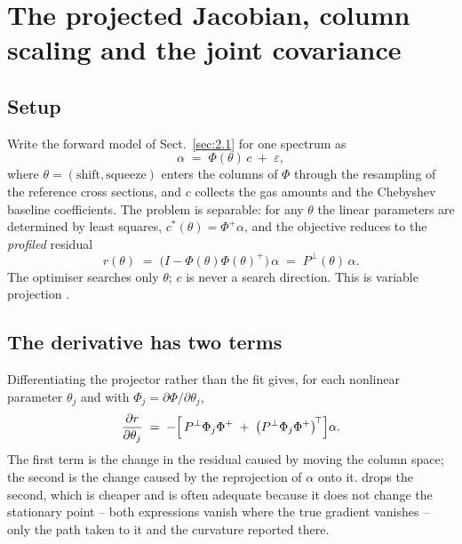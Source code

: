 \section{The projected Jacobian, column scaling and the joint covariance}
\label{app:B}

\subsection{Setup}
\label{app:B1}

Write the forward model of Sect.~\ref{sec:2.1} for one spectrum as
\begin{equation*}
\alpha \;=\; \Phi(\theta)\,c \;+\; \varepsilon ,
\end{equation*}
where $\theta = (\text{shift}, \text{squeeze})$ enters the columns of $\Phi$
through the resampling of the reference cross sections, and $c$ collects the
gas amounts and the Chebyshev baseline coefficients. The problem is separable:
for any $\theta$ the linear parameters are determined by least squares,
$c^\ast(\theta) = \Phi^{+}\alpha$, and the objective reduces to the \emph{profiled}
residual
\begin{equation*}
r(\theta) \;=\; \bigl(I - \Phi(\theta)\Phi(\theta)^{+}\bigr)\,\alpha
\;=\; P^{\perp}(\theta)\,\alpha .
\end{equation*}
The optimiser searches only $\theta$; $c$ is never a search direction. This is
variable projection \citep{Golub_1973}.

\subsection{The derivative has two terms}
\label{app:B2}

Differentiating the projector rather than the fit gives, for each nonlinear
parameter $\theta_j$ and with $\Phi_j = \partial\Phi/\partial\theta_j$,
\begin{equation*}
\frac{\partial r}{\partial \theta_j}
\;=\; -\Bigl[\, P^{\perp}\Phi_j\Phi^{+}
\;+\; \bigl(P^{\perp}\Phi_j\Phi^{+}\bigr)^{\!\top} \Bigr]\alpha .
\end{equation*}
The first term is the change in the residual caused by moving the column
space; the second is the change caused by the reprojection of $\alpha$ onto
it. \citet{Kaufman_1975} drops the second, which is cheaper and is often adequate
because it does not change the stationary point -- both expressions vanish
where the true gradient vanishes -- only the path taken to it and the
curvature reported there.

